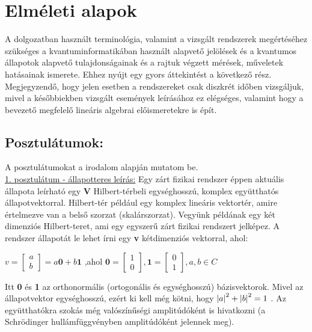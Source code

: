 





\section{Elméleti alapok}

A dolgozatban használt terminológia, valamint a vizsgált rendszerek megértéséhez szükséges a kvantuminformatikában használt alapvető jelölések és a kvantumos állapotok alapvető tulajdonságainak és a rajtuk végzett mérések, műveletek hatásainak ismerete. Ehhez nyújt egy gyors áttekintést a következő rész. Megjegyzendő, hogy jelen esetben a rendszereket csak diszkrét időben vizsgáljuk, mivel a későbbiekben vizsgált események leírásához ez elégséges, valamint hogy a bevezető megfelelő lineáris algebrai előismeretekre is épít.

\subsection{Posztulátumok:} 
A posztulátumokat a \cite{kvantkonyv1} irodalom alapján mutatom be.\\

\underline{1. posztulátum - állapotteres leírás:} Egy zárt fizikai rendszer éppen aktuális állapota leírható egy \textbf{V} Hilbert-térbeli egységhosszú, komplex együtthatós állapotvektorral. Hilbert-tér például egy komplex lineáris vektortér, amire értelmezve van a belső szorzat (skalárszorzat). 
Vegyünk példának egy két dimenziós Hilbert-teret, ami egy egyszerű zárt fizikai rendszert jelképez. A rendszer állapotát le lehet írni egy \textbf{v} kétdimenziós vektorral, ahol:\\
\begin{center}
$ v= \begin{bmatrix} a\\b \end{bmatrix} = a\textbf{0}+ b\textbf{1} $ ,ahol 
$\textbf{0}=\begin{bmatrix} 1\\0 \end{bmatrix} , \textbf{1}=\begin{bmatrix} 0\\1 \end{bmatrix} ,   a,b \in C$
\end{center}
Itt \textbf{0} és \textbf{1} az orthonormális (ortogonális és egységhosszú) bázisvektorok. Mivel az állapotvektor egységhosszú, ezért ki kell még kötni, hogy 
$\abs{a}^2+\abs{b}^2 =1$ . Az együtthatókra szokás még valószínűségi amplitúdóként is hivatkozni (a Schrödinger hullámfüggvényben amplitúdóként jelennek meg).

